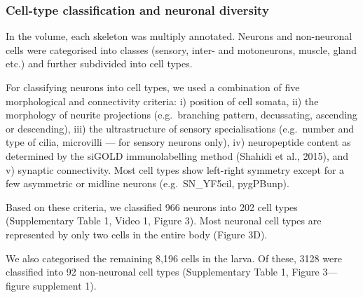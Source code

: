 \documentclass[
  11pt,
]{article}
\begin{document}
\subsubsection{Cell-type classification and neuronal
diversity}\label{cell-type-classification-and-neuronal-diversity}

In the volume, each skeleton was multiply annotated. Neurons and
non-neuronal cells were categorised into classes (sensory, inter- and
motoneurons, muscle, gland etc.) and further subdivided into cell types.

For classifying neurons into cell types, we used a combination of five
morphological and connectivity criteria: i) position of cell somata, ii)
the morphology of neurite projections (e.g.~branching pattern,
decussating, ascending or descending), iii) the ultrastructure of
sensory specialisations (e.g.~number and type of cilia, microvilli ---
for sensory neurons only), iv) neuropeptide content as determined by the
siGOLD immunolabelling method (Shahidi et al., 2015), and v) synaptic
connectivity. Most cell types show left-right symmetry except for a few
asymmetric or midline neurons (e.g.~SN\_YF5cil, pygPBunp).

Based on these criteria, we classified 966 neurons into 202 cell types
(Supplementary Table 1, Video 1, Figure 3). Most neuronal cell types are
represented by only two cells in the entire body (Figure 3D).

We also categorised the remaining 8,196 cells in the larva. Of these,
3128 were classified into 92 non-neuronal cell types (Supplementary
Table 1, Figure 3---figure supplement 1).
\end{document}
